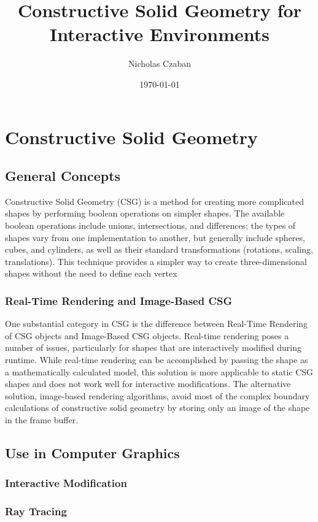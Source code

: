 \documentclass[12pt]{article}
\begin{document}
\title{Constructive Solid Geometry for Interactive Environments}
\author{Nicholas Czaban}
\date{\today}
\maketitle

\section{Constructive Solid Geometry}
\subsection{General Concepts}
\indent Constructive Solid Geometry (CSG) is a method for creating more complicated shapes by performing boolean operations on simpler shapes. The available boolean operations include unions, intersections, and differences; the types of shapes vary from one implementation to another, but generally include spheres, cubes, and cylinders, as well as their standard transformations (rotations, scaling, translations)\cite{cs_dictionary}. This technique provides a simpler way to create three-dimensional shapes without the need to define each vertex
\subsubsection{Real-Time Rendering and Image-Based CSG}
\indent One substantial category in CSG is the difference between Real-Time Rendering of CSG objects and Image-Based CSG objects. Real-time rendering poses a number of issues, particularly for shapes that are interactively modified during runtime. While real-time rendering can be accomplished by passing the shape as a mathematically calculated model, this solution is more applicable to static CSG shapes and does not work well for interactive modifications\cite{open_csg}. The alternative solution, image-based rendering algorithms, avoid most of the complex boundary calculations of constructive solid geometry by storing only an image of the shape in the frame buffer\cite{open_csg}. 
\subsection{Use in Computer Graphics}
\subsubsection{Interactive Modification}
\subsubsection{Ray Tracing}
\end{document}

